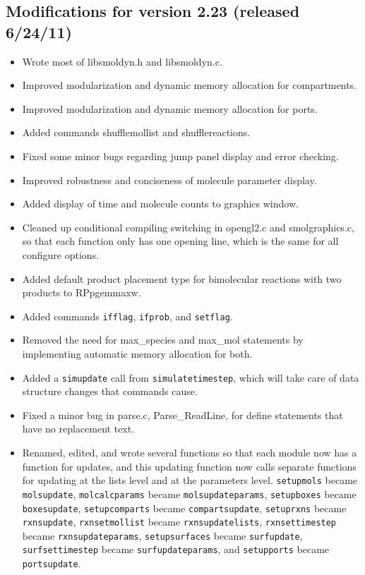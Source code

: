 \documentclass {scrbook}
\newcommand {\ttt} {\texttt}
\begin{document}
\subsection{Modifications for version 2.23 (released 6/24/11)}
\begin{itemize}
\item Wrote most of libsmoldyn.h and libsmoldyn.c.
\item Improved modularization and dynamic memory allocation for compartments.
\item Improved modularization and dynamic memory allocation for ports.
\item Added commands shufflemollist and shufflereactions.
\item Fixed some minor bugs regarding jump panel display and error checking.
\item Improved robustness and conciseness of molecule parameter display.
\item Added display of time and molecule counts to graphics window.
\item Cleaned up conditional compiling switching in opengl2.c and smolgraphics.c, so that each function only has one opening line, which is the same for all configure options.
\item Added default product placement type for bimolecular reactions with two products to RPpgemmaxw.
\item Added commands \ttt{ifflag}, \ttt{ifprob}, and \ttt{setflag}.
\item Removed the need for max\_species and max\_mol statements by implementing automatic memory allocation for both.
\item Added a \ttt{simupdate} call from \ttt{simulatetimestep}, which will take care of data structure changes that commands cause.
\item Fixed a minor bug in parse.c, Parse\_ReadLine, for define statements that have no replacement text.
\item Renamed, edited, and wrote several functions so that each module now has a function for updates, and this updating function now calls separate functions for updating at the lists level and at the parameters level. \ttt{setupmols} became \ttt{molsupdate}, \ttt{molcalcparams} became \ttt{molsupdateparams}, \ttt{setupboxes} became \ttt{boxesupdate}, \ttt{setupcomparts} became \ttt{compartsupdate}, \ttt{setuprxns} became \ttt{rxnsupdate}, \ttt{rxnsetmollist} became \ttt{rxnsupdatelists}, \ttt{rxnsettimestep} became \ttt{rxnsupdateparams}, \ttt{setupsurfaces} became \ttt{surfupdate}, \ttt{surfsettimestep} became \ttt{surfupdateparams}, and \ttt{setupports} became \ttt{portsupdate}.

\end{itemize}
\end{document}
